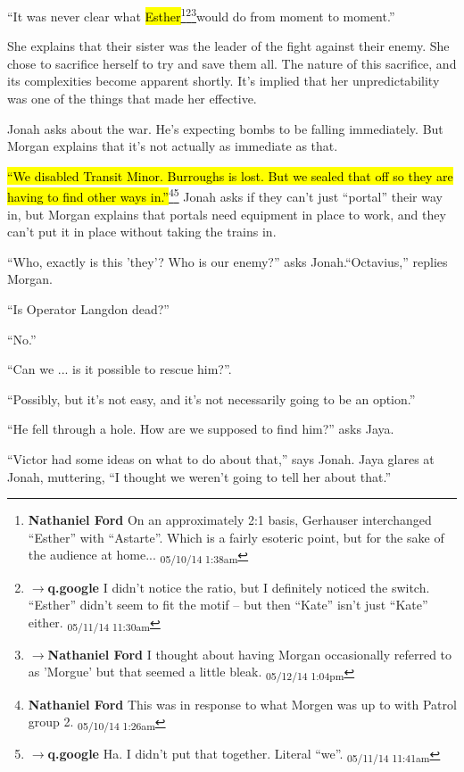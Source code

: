 ``It was never clear what \hl{Esther}\footnote{\textbf{Nathaniel Ford }On an approximately 2:1 basis, Gerhauser interchanged ``Esther'' with ``Astarte''. Which is a fairly esoteric point, but for the sake of the audience at home... \textsubscript{05/10/14 1:38am}}\footnote{$\rightarrow$\textbf{q.google }I didn't notice the ratio, but I definitely noticed the switch.  ``Esther'' didn't seem to fit the motif -- but then ``Kate'' isn't just ``Kate'' either. \textsubscript{05/11/14 11:30am}}\footnote{$\rightarrow$\textbf{Nathaniel Ford }I thought about having Morgan occasionally referred to as 'Morgue' but that seemed a little bleak. \textsubscript{05/12/14 1:04pm}}would do from moment to moment.''

She explains that their sister was the leader of the fight against their enemy.  She chose to sacrifice herself to try and save them all.  The nature of this sacrifice, and its complexities become apparent shortly.  It's implied that her unpredictability was one of the things that made her effective.

Jonah asks about the war.  He's expecting bombs to be falling immediately.  But Morgan explains that it's not actually as immediate as that. 

\hl{``We disabled Transit Minor.  Burroughs is lost.  But we sealed that off so they are having to find other ways in.''}\footnote{\textbf{Nathaniel Ford }This was in response to what Morgen was up to with Patrol group 2. \textsubscript{05/10/14 1:26am}}\footnote{$\rightarrow$\textbf{q.google }Ha.  I didn't put that together.  Literal ``we''. \textsubscript{05/11/14 11:41am}}  Jonah asks if they can't just ``portal'' their way in, but Morgan explains that portals need equipment in place to work, and they can't put it in place without taking the trains in.

``Who, exactly is this 'they'?  Who is our enemy?'' asks Jonah.``Octavius,'' replies Morgan.

``Is Operator Langdon dead?'' 

``No.''

``Can we ... is it possible to rescue him?''.

``Possibly, but it's not easy, and it's not necessarily going to be an option.''

``He fell through a hole.  How are we supposed to find him?''  asks Jaya.

``Victor had some ideas on what to do about that,'' says Jonah. Jaya glares at Jonah, muttering, ``I thought we weren't going to tell her about that.''

